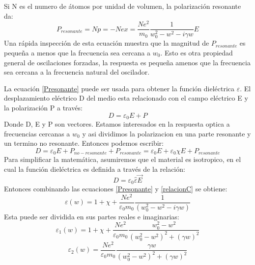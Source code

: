 \documentclass[a4paper,openright,12pt]{book}
\begin{document}
Si N es el numero de átomos por unidad de volumen, la polarización resonante da:
\begin{equation}\label{Presonante}
P_{resonante}=Np=-Nex=\frac{Ne^{2}}{m_{0}}\frac{1}{w_{0}^{2}-w^{2}-i\gamma w}E
\end{equation}
Una rápida inspección de esta ecuación muestra que la magnitud de $P_{resonante}$ es pequeña a menos que la frecuencia sea cercana a $w_{0}$. Esto es otra propiedad general de oscilaciones forzadas, la respuesta es pequeña amenos que la frecuencia sea cercana a la frecuencia natural del oscilador.

La ecuación \ref{Presonante} puede ser usada para obtener la función dieléctrica $\varepsilon$. El desplazamiento eléctrico D del medio esta relacionado con el campo eléctrico E y la polarización P a través:
\begin{equation}\label{ecuacion211}
D=\varepsilon_{0}E+P
\end{equation}
Donde D, E y P son vectores. Estamos interesados en la respuesta optica a frecuencias cercanas a $w_{0}$ y asi dividimos la polarizacion en una parte resonante y un termino no resonante. Entonces podemos escribir:
\begin{equation}\label{ecuacion212}
D=\varepsilon_{0}E+P_{no-resonante}+P_{resonante}=\varepsilon_{0}E+\varepsilon_{0}\chi E+P_{resonante}
\end{equation}
Para simplificar la matemática, asumiremos que el material es isotropico, en el cual la función dieléctrica es definida a través de la relación:
\begin{equation}\label{relacionC}
D=\varepsilon_{0}\hat{\varepsilon}\vec{E}
\end{equation}
Entonces combinando las ecuaciones \ref{Presonante} y \ref{relacionC} se obtiene:
\begin{equation}
\varepsilon(w)=1+\chi +\frac{N e^{2}}{\varepsilon_{0}m_{0}}\frac{1}{(w_{0}^{2}-w^{2}-i\gamma w)}
\end{equation}
Esta puede ser dividida en sus partes reales e imaginarias:
\begin{equation}\label{var1lorentz}
\varepsilon_{1}(w)=1+\chi+\frac{Ne^{2}}{\varepsilon_{0}m_{0}}\frac{w_{0}^{2}-w^{2}}{(w_{0}^{2}-w^{2})^{2}+(\gamma w)^{2}}
\end{equation}
\begin{equation}\label{var2lorentz}
\varepsilon_{2}(w)=\frac{Ne^{2}}{\varepsilon_{0}m_{0}}\frac{\gamma w}{(w_{0}^{2}-w^{2})^{2}+(\gamma w)^{2}}
\end{equation}
\end{document}
